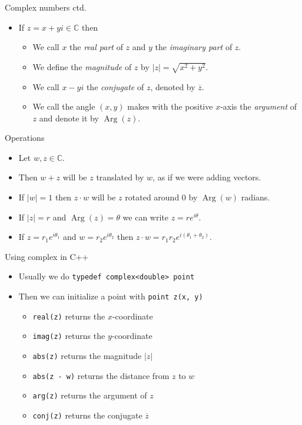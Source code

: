 \documentclass{beamer}
\begin{document}
\begin{frame}[plain]{Complex numbers ctd.}
	\begin{itemize}
        \item If $z = x + yi \in \mathbb{C}$ then
		\begin{itemize}
            \item We call $x$ the \emph{real part} of $z$ and $y$ the \emph{imaginary part} of $z$.
            \item We define the \emph{magnitude} of $z$ by $|z| = \sqrt{x^2 + y^2}$.
            \item We call $x - yi$ the \emph{conjugate} of $z$, denoted by $\overline{z}$.
            \item We call the angle $(x, y)$ makes with the positive $x$-axis the \emph{argument} of $z$ and
                denote it by $\operatorname{Arg}(z)$.
        \end{itemize}
    \end{itemize}
\end{frame}

\begin{frame}[plain]{Operations}
	\begin{itemize}
        \item Let $w, z \in \mathbb{C}$.
        \item Then $w + z$ will be $z$ translated by $w$, as if we were adding vectors.
        \item If $|w| = 1$ then $z \cdot w$ will be $z$ rotated around $0$ by $\operatorname{Arg}(w)$ radians.
        \item If $|z| = r$ and $\operatorname{Arg}(z) = \theta$ we can write $z = re^{i\theta}$.
        \item If $z = r_1e^{i\theta_1}$ and $w = r_2e^{i\theta_2}$ then $z \cdot w = r_1 r_2 e^{i(\theta_1 + \theta_2)}$.
    \end{itemize}
\end{frame}

\begin{frame}[plain]{Using complex in C++}
    \begin{itemize}
        \item Usually we do \texttt{typedef complex<double> point}
        \item Then we can initialize a point with \texttt{point z(x, y)}
        \begin{itemize}
            \item \texttt{real(z)} returns the $x$-coordinate
            \item \texttt{imag(z)} returns the $y$-coordinate
            \item \texttt{abs(z)} returns the magnitude $|z|$
            \item \texttt{abs(z - w)} returns the distance from $z$ to $w$
            \item \texttt{arg(z)} returns the argument of $z$
            \item \texttt{conj(z)} returns the conjugate $\overline{z}$
        \end{itemize}
    \end{itemize}
\end{frame}
\end{document}
